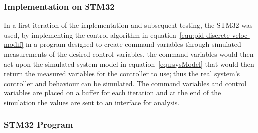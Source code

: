 \subsubsection{Implementation on STM32}
In a first iteration of the implementation and subsequent testing, the STM32 was used, by implementing the control algorithm in equation~\ref{equ:pid-discrete-veloc-modif} in a program designed to create command variables through simulated measurements of the desired control variables, the command variables would then act upon the simulated system model in equation~\ref{equ:sysModel} that would then return the measured variables for the controller to use; thus the real system's controller and behaviour can be simulated.
The command variables and control variables are placed on a buffer for each iteration and at the end of the simulation the values are sent to an interface for analysis.
\subsubsection{STM32 Program}

